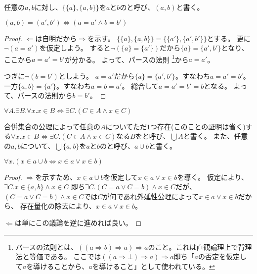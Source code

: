 \documentclass[uplatex,papersize,dvipdfmx]{jsarticle}
\begin{document}
    \begin{definition}[順序対]
      任意の$a, b$に対し、$\{\{a\}, \{a, b\}\}$を$a$と$b$のと呼び、$(a, b)$と書く。
    \end{definition}
    \begin{corollary}
      $(a, b) = (a', b') \Leftrightarrow (a = a' \land b = b')$
      \begin{proof}
        $\Leftarrow$は自明だから$\Rightarrow$を示す。
        $\{\{a\}, \{a, b\}\} = \{\{a'\}, \{a', b'\}\}$とする。
        更に$\lnot(a = a')$を仮定しよう。
        すると$\lnot(\{a\} = \{a'\})$だから$\{a\} = \{a', b'\}$となり、
        ここから$a = a' = b'$が分かる。
        よって、パースの法則
        \footnote{パースの法則とは、$((a \Rightarrow b) \Rightarrow a) \Rightarrow a$のこと。これは直観論理上で背理法と等価である。
        ここでは$((a \Rightarrow \bot) \Rightarrow a) \Rightarrow a$即ち「$a$の否定を仮定して$a$を導けることから、$a$を導けること」として使われている。}から$a = a'$。

        つぎに$\lnot(b = b')$としよう。
        $a = a'$だから$\{a\} = \{a', b'\}$。すなわち$a = a' = b'$。
        一方$\{a, b\} = \{a'\}$。すなわち$a = b = a'$。
        総合して$a = a' = b' = b$となる。
        よって、パースの法則から$b = b'$。
      \end{proof}
    \end{corollary}
    \begin{axiom}[合併集合の公理]
      $\forall A. \exists B. \forall x. x \in B \Leftrightarrow \exists C. (C \in A \land x \in C)$
    \end{axiom}
    \begin{definition}[合併集合]
      合併集合の公理によって任意の$A$についてただ$1$つ存在(このことの証明は省く)する$\forall x. x \in B \Leftrightarrow \exists C. (C \in A \land x \in C)$なる$B$をと呼び、$\bigcup A$と書く。
      また、任意の$a, b$について、$\bigcup \{a, b\}$を$a$と$b$のと呼び、$a \cup b$と書く。
    \end{definition}
    \begin{corollary}
      $\forall x. (x \in a \cup b \Leftrightarrow x \in a \lor x \in b)$
      \begin{proof}
        $\Rightarrow$を示すため、$x \in a \cup b$を仮定して$x \in a \lor x \in b$を導く。
        仮定により、
        $\exists C. x \in \{a, b\} \land x \in C$
        即ち$\exists C. (C = a \lor C = b) \land x \in C$だが、
        $(C = a \lor C = b) \land x \in C$では$C$が何であれ外延性公理によって$x \in a \lor x \in b$だから、
        存在量化の除去により、$x \in a \lor x \in b$。

        $\Leftarrow$は単にこの議論を逆に進めれば良い。
      \end{proof}
    \end{corollary}
\end{document}
